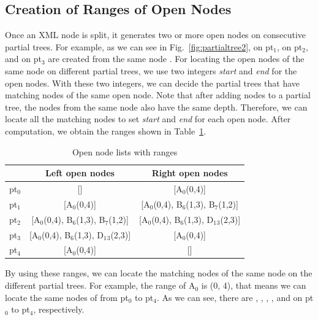 \subsection{Creation of Ranges of Open Nodes}  
Once an XML node is split, it generates two or more open nodes
on consecutive partial trees. For example, as we can see in Fig.~\ref{fig:partialtree2}, 
 on pt$_1$,  on pt$_2$, and   on pt$_3$ 
are created from the same node .
For locating the open nodes of the same node on different partial trees, 
we use two integers \textit{start} and \textit{end} for the open nodes. With these two integers, 
we can decide the partial trees that have matching nodes of the same open node.
Note that after adding nodes to a partial tree, the nodes from the same node also have the 
same depth. Therefore, we can locate all the matching nodes to set \textit{start} and \textit{end} for each open node. 
After computation, we obtain the ranges shown in Table~\ref{table:rangesresult}. 

\begin{table}[t]
	\caption{Open node lists with ranges}
	\label{table:rangesresult}
	\centering
	\begin{tabular}{c|cc}
		\hline
		& Left open nodes	& Right open nodes \\
		\hline
		pt$_0$	& []	& [A$_0$(0,4)] \\
		pt$_1$	& [A$_0$(0,4)]	& [A$_0$(0,4), B$_6$(1,3), B$_7$(1,2)] \\
		pt$_2$	& [A$_0$(0,4), B$_6$(1,3), B$_7$(1,2)]	& [A$_0$(0,4), B$_6$(1,3), D$_1$$_3$(2,3)] \\
		pt$_3$	& [A$_0$(0,4), B$_6$(1,3), D$_1$$_3$(2,3)]	& [A$_0$(0,4)] \\
		pt$_4$	& [A$_0$(0,4)]	& [] \\
		\hline
	\end{tabular}
\end{table}

By using these ranges, we can locate the matching nodes of the same node on the different partial trees.
For example, the range of A$_0$ is (0, 4), that means we can 
locate the same nodes of  from pt$_0$ to pt$_4$.
As we can see, there are , , , 
, and  on pt$_0$ to pt$_4$, respectively.


